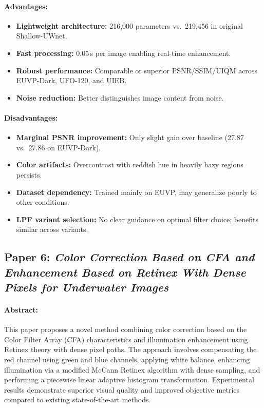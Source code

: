 \documentclass{article}
\begin{document}
\paragraph{Advantages:}
\begin{itemize}
    \item \textbf{Lightweight architecture:} 216,000 parameters vs.\ 219,456 in original Shallow-UWnet.
    \item \textbf{Fast processing:} 0.05\,s per image enabling real-time enhancement.
    \item \textbf{Robust performance:} Comparable or superior PSNR/SSIM/UIQM across EUVP-Dark, UFO-120, and UIEB.
    \item \textbf{Noise reduction:} Better distinguishes image content from noise.
\end{itemize}

\paragraph{Disadvantages:}
\begin{itemize}
    \item \textbf{Marginal PSNR improvement:} Only slight gain over baseline (27.87 vs.\ 27.86 on EUVP-Dark).
    \item \textbf{Color artifacts:} Overcontrast with reddish hue in heavily hazy regions persists.
    \item \textbf{Dataset dependency:} Trained mainly on EUVP, may generalize poorly to other conditions.
    \item \textbf{LPF variant selection:} No clear guidance on optimal filter choice; benefits similar across variants.
\end{itemize}

\subsection{Paper 6: \textit{Color Correction Based on CFA and Enhancement
        Based on Retinex With Dense Pixels for
        Underwater Images\cite{Li_2020}}}

\paragraph{Abstract:}
This paper proposes a novel method combining color correction based on the Color Filter Array (CFA) characteristics and illumination enhancement using Retinex theory with dense pixel paths. The approach involves compensating the red channel using green and blue channels, applying white balance, enhancing illumination via a modified McCann Retinex algorithm with dense sampling, and performing a piecewise linear adaptive histogram transformation. Experimental results demonstrate superior visual quality and improved objective metrics compared to existing state-of-the-art methods.
\end{document}
